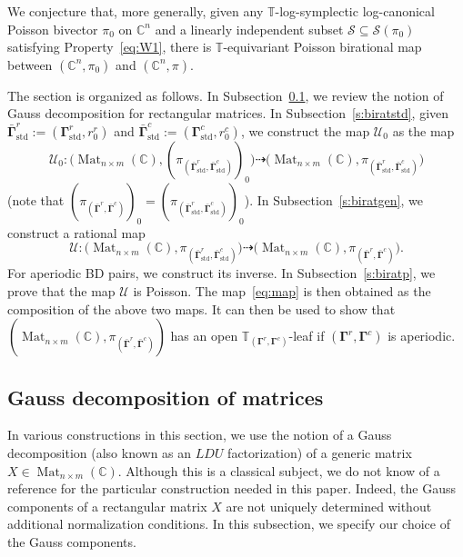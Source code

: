 \documentclass[11pt]{article}
\newcommand{\bbg}{\bar{\mathbf{\Gamma}}}
\newcommand{\bg}{\mathbf{\Gamma}}
\newcommand{\std}{\mathrm{std}}
\DeclareMathOperator{\Mat}{Mat}
\theoremstyle{definition}\newtheorem{definition}[theorem]{Definition}
\theoremstyle{definition}\newtheorem{remark}[theorem]{Remark}
\theoremstyle{remark}
\numberwithin{equation}{section}
\begin{document}
We conjecture that, more generally, given any $\mathbb{T}$-log-symplectic log-canonical Poisson bivector $\pi_0$ on $\mathbb{C}^n$ and a linearly independent subset $\mathcal{S}\subseteq \mathcal{S}(\pi_0)$ satisfying Property~\eqref{eq:W1}, there is $\mathbb{T}$-equivariant Poisson birational map between $(\mathbb{C}^n,\pi_0)$ and $(\mathbb{C}^n,\pi)$.

The section is organized as follows. In Subsection~\ref{s:gauss}, we review the notion of Gauss decomposition for rectangular matrices. In Subsection~\ref{s:biratstd}, given $\bbg_{\std}^r :=(\bg^r_{\std},r_0^r)$ and $\bbg_{\std}^c := (\bg^c_{\std},r_0^c)$, we construct the map $\mathcal{U}_0$ as the map
\begin{equation*}
    \mathcal{U}_0 : \big(\Mat_{n\times m}(\mathbb{C}),(\pi_{(\bbg^r_{\std},\bbg^c_{\std})})_0 \big)\dashrightarrow \big(\Mat_{n\times m}(\mathbb{C}),\pi_{(\bbg^r_{\std},\bbg^c_{\std})}\big)
\end{equation*}
(note that $(\pi_{(\bbg^r,\bbg^c)})_0 = (\pi_{(\bbg^r_{\std},\bbg^c_{\std})})_0$). In Subsection~\ref{s:biratgen}, we construct a rational map
\begin{equation*}
    \mathcal{U} : \big(\Mat_{n\times m}(\mathbb{C}),\pi_{(\bbg^r_{\std},\bbg^c_{\std})}\big) \dashrightarrow \big(\Mat_{n\times m}(\mathbb{C}),\pi_{(\bbg^r,\bbg^c)}\big).
\end{equation*}
For aperiodic BD pairs, we construct its inverse. In Subsection~\ref{s:biratp}, we prove that the map $\mathcal{U}$ is Poisson.
The map~\eqref{eq:map} is then obtained as the composition of the above two maps. It can then be used to show that $(\Mat_{n \times m}(\mathbb{C}), \pi_{(\bbg^r,\bbg^c)})$ has an open $\mathbb{T}_{(\bg^r,\bg^c)}$-leaf if $(\bg^r,\bg^c)$ is aperiodic.

\subsection{Gauss decomposition of matrices}\label{s:gauss}
In various constructions in this section, we use the notion of a Gauss decomposition (also known as an $LDU$ factorization) of a generic matrix $X \in \Mat_{n\times m}(\mathbb{C})$. Although this is a classical subject, we do not know of a reference for the particular construction needed in this paper. Indeed, the Gauss components of a rectangular matrix $X$ are not uniquely determined without additional normalization conditions. In this subsection, we specify our choice of the Gauss components. 
\end{document}
